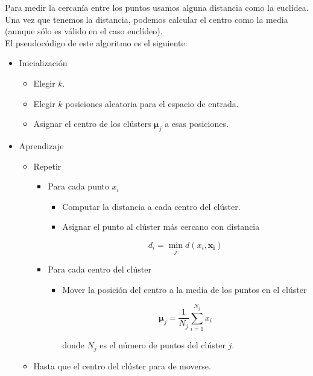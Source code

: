 Para medir la cercanía entre los puntos usamos alguna distancia como la euclídea. Una vez que tenemos la distancia, podemos calcular el centro como la media (aunque sólo es válido en el caso euclídeo).\\

El pseudocódigo de este algoritmo es el siguiente:

\begin{itemize}
\item Inicialización

\begin{itemize}
\item Elegir $k$.
\item Elegir $k$ posiciones aleatoria para el espacio de entrada.
\item Asignar el centro de los clústers $\mathbf{\mu}_j$ a esas posiciones.
\end{itemize}

\item Aprendizaje

\begin{itemize}
\item Repetir

\begin{itemize}
\item Para cada punto $x_i$

\begin{itemize}
\item Computar la distancia a cada centro del clúster.
\item Asignar el punto al clúster más cercano con distancia

\begin{equation}
d_i = \min_j d(x_i, \mathbf{x_i})
\end{equation}
\end{itemize}

\item Para cada centro del clúster

\begin{itemize}
\item Mover la posición del centro a la media de los puntos en el clúster

\begin{equation}
\mathbf{\mu}_j = \dfrac{1}{N_j} \sum_{i=1}^{N_j} x_i
\end{equation}

donde $N_j$ es el número de puntos del clúster $j$.
\end{itemize}

\end{itemize}

\item Hasta que el centro del clúster para de moverse.

\end{itemize}

\end{itemize}  

